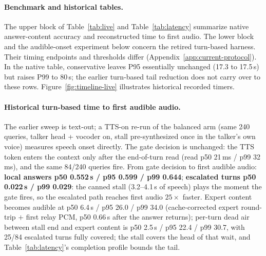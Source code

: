 
\paragraph{Benchmark and historical tables.} The upper block of
Table~\ref{tab:live} and Table~\ref{tab:latency} summarize native
answer-content accuracy and reconstructed time to first audio. The
lower block and the audible-onset experiment below concern the retired
turn-based harness. Their timing endpoints and thresholds differ
(Appendix~\ref{app:current-protocol}). In the native table,
conservative leaves P95 essentially unchanged (17.3 to 17.5\,s) but
raises P99 to 80\,s; the earlier turn-based tail reduction does not
carry over to these rows.
Figure~\ref{fig:timeline-live} illustrates historical recorded timers.

\paragraph{Historical turn-based time to first audible audio.} The earlier sweep is
text-out; a TTS-on re-run of the balanced arm (same 240 queries,
talker head + vocoder on, stall pre-synthesized once in the talker's
own voice) measures speech onset directly. The gate decision is
unchanged: the TTS token enters the context only after the
end-of-turn read (read p50 21\,ms / p99 32\,ms), and the same
84/240 queries fire. From gate decision to first audible audio:
\textbf{local answers p50 0.552\,s / p95 0.599 / p99 0.644};
\textbf{escalated turns p50 0.022\,s / p99 0.029}: the canned
stall (3.2--4.1\,s of speech) plays the moment the gate fires, so
the escalated path reaches first audio $25\times$ faster. Expert
content becomes audible at p50 6.4\,s / p95 26.0 / p99
34.0 (cache-corrected expert round-trip $+$ first relay PCM, p50
0.66\,s after the answer returns); per-turn dead air between stall
end and expert content is p50 2.5\,s / p95 22.4 / p99 30.7, with
25/84 escalated turns fully covered; the stall covers the head of
that wait, and Table~\ref{tab:latency}'s completion profile bounds
the tail.

